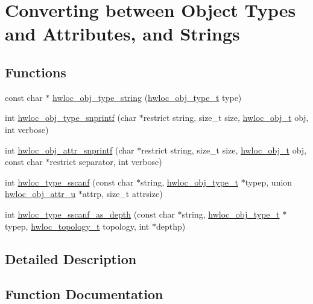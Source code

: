 \hypertarget{a00188}{}\section{Converting between Object Types and Attributes, and Strings}
\label{a00188}
\subsection*{Functions}
\begin{DoxyCompactItemize}
\item 
const char $\ast$ \hyperlink{a00188_ga5ca0bf94bbbb080d0eff17a57bd90422}{hwloc\+\_\+obj\+\_\+type\+\_\+string} (\hyperlink{a00184_gacd37bb612667dc437d66bfb175a8dc55}{hwloc\+\_\+obj\+\_\+type\+\_\+t} type)
\item 
int \hyperlink{a00188_gadb8765c260edea80c52cd06a76639ba4}{hwloc\+\_\+obj\+\_\+type\+\_\+snprintf} (char $\ast$restrict string, size\+\_\+t size, \hyperlink{a00185_ga79b8ab56877ef99ac59b833203391c7d}{hwloc\+\_\+obj\+\_\+t} obj, int verbose)
\item 
int \hyperlink{a00188_ga870e876931c282a1c7aee2f031912ce3}{hwloc\+\_\+obj\+\_\+attr\+\_\+snprintf} (char $\ast$restrict string, size\+\_\+t size, \hyperlink{a00185_ga79b8ab56877ef99ac59b833203391c7d}{hwloc\+\_\+obj\+\_\+t} obj, const char $\ast$restrict separator, int verbose)
\item 
int \hyperlink{a00188_ga510f21b066fba2dab12b8c9b173b1dfd}{hwloc\+\_\+type\+\_\+sscanf} (const char $\ast$string, \hyperlink{a00184_gacd37bb612667dc437d66bfb175a8dc55}{hwloc\+\_\+obj\+\_\+type\+\_\+t} $\ast$typep, union \hyperlink{a00242}{hwloc\+\_\+obj\+\_\+attr\+\_\+u} $\ast$attrp, size\+\_\+t attrsize)
\item 
int \hyperlink{a00188_ga52c63cd7203e55b804c1314affc9bd12}{hwloc\+\_\+type\+\_\+sscanf\+\_\+as\+\_\+depth} (const char $\ast$string, \hyperlink{a00184_gacd37bb612667dc437d66bfb175a8dc55}{hwloc\+\_\+obj\+\_\+type\+\_\+t} $\ast$typep, \hyperlink{a00186_ga9d1e76ee15a7dee158b786c30b6a6e38}{hwloc\+\_\+topology\+\_\+t} topology, int $\ast$depthp)
\end{DoxyCompactItemize}


\subsection{Detailed Description}


\subsection{Function Documentation}
\mbox{\label{a00188_ga870e876931c282a1c7aee2f031912ce3}} 
